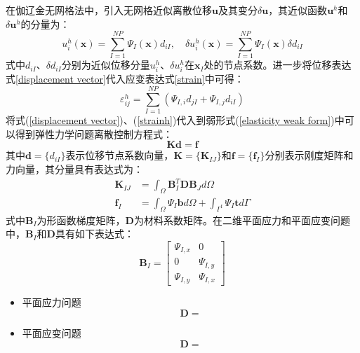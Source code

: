 在伽辽金无网格法中，引入无网格近似离散位移$\pmb u$及其变分$\delta \pmb u$，其近似函数$\pmb u^h$和$\delta \pmb u^h$的分量为：
\begin{equation}\label{displacement vector}
    u^h_{i}(\pmb x) = \sum_{I=1}^{N\!P}\Psi_I(\pmb x) d_{iI}, \quad \delta u^h_{i}(\pmb x) = \sum_{I=1}^{N\!P}\Psi_I(\pmb x) \delta d_{iI}
\end{equation}
式中$d_{iI}$、$\delta d_{iI}$分别为近似位移分量$u^h_i$、$\delta u^h_i$在$\pmb x_I$处的节点系数。进一步将位移表达式\ref{displacement vector}代入应变表达式\ref{strain}中可得：
\begin{equation}\label{strainh}
\varepsilon^h_{ij} = \sum_{I=1}^{N\!P} (\Psi_{I,i}d_{jI}+\Psi_{I,j}d_{iI})
\end{equation}
将式(\ref{displacement vector})、(\ref{strainh})代入到弱形式(\ref{elasticity weak form})中可以得到弹性力学问题离散控制方程式：
\begin{equation}
    \pmb{K}\pmb{d}=\pmb{f}
\end{equation}
其中$\pmb{d}=\{d_{iI}\}$表示位移节点系数向量，$\pmb{K}=\{\pmb K_{I\!J}\}$和$\pmb{f}=\{\pmb f_I\}$分别表示刚度矩阵和力向量，其分量具有表达式为：
\begin{subequations}\label{EKf}
\begin{align}
        \pmb K_{I\!J}&=\int_{\Omega}\pmb{B}_I^T\pmb{D}\pmb{B}_Jd\Omega\label{EKf1}\\
        \pmb f_I&=\int_{\Omega}\Psi_I\pmb{b}d\Omega+\int_{\Gamma^t}\Psi_I\pmb{t}d\Gamma\label{EKf2}
\end{align}
\end{subequations}
式中$\pmb B_I$为形函数梯度矩阵，$\pmb D$为材料系数矩阵。在二维平面应力和平面应变问题中，$\pmb B_I$和$\pmb D$具有如下表达式：
\begin{equation}\label{strain vector}
    \pmb{B}_I= \left[\begin{matrix}\Psi_{I,x}&0\\0&\Psi_{I,y}\\\Psi_{I,y}&\Psi_{I,x} \end{matrix}\right] 
\end{equation}
\begin{itemize}
    \item 平面应力问题
\begin{equation}
\pmb D = 
\end{equation}
\item 平面应变问题
\begin{equation}
\pmb D = 
\end{equation}
\end{itemize}
